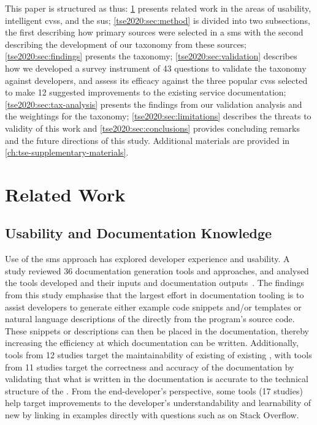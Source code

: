 This paper is structured as thus: \cref{tse2020:sec:related-work} presents related work in the areas of  usability, intelligent \glspl{cvs}, and the \gls{sus}; \cref{tse2020:sec:method} is divided into two subsections, the first describing how primary sources were selected in a \gls{sms} with the second describing the development of our taxonomy from these sources; \cref{tse2020:sec:findings} presents the taxonomy; \cref{tse2020:sec:validation} describes how we developed a survey instrument of 43 questions to validate the taxonomy against developers, and assess its efficacy against the three popular \glspl{cvs} selected to make 12 suggested improvements to the existing service  documentation; \cref{tse2020:sec:tax-analysis} presents the findings from our validation analysis and the weightings for the taxonomy; \cref{tse2020:sec:limitations} describes the threats to validity of this work and \cref{tse2020:sec:conclusions} provides concluding remarks and the future directions of this study. Additional materials are provided in \cref{ch:tse-supplementary-materials}.

\section{Related Work}
\label{tse2020:sec:related-work}



\subsection{ Usability and Documentation Knowledge}

Use of the \gls{sms} approach has explored developer experience and  usability. A~\citeyear{Nybom:2018ef} study reviewed 36  documentation generation tools and approaches, and analysed the tools developed and their inputs and documentation outputs~\citep{Nybom:2018ef}. The findings from this study emphasise that the largest effort in  documentation tooling is to assist developers to generate either example code snippets and/or templates or natural language descriptions of the  directly from the program's source code. These snippets or descriptions can then be placed in the  documentation, thereby increasing the efficiency at which  documentation can be written. Additionally, tools from 12 studies target the maintainability of existing  of existing , with tools from 11 studies target the correctness and accuracy of the documentation by validating that what is written in the documentation is accurate to the technical structure of the . From the end-developer's perspective, some tools (17 studies) help target improvements to the developer's understandability and learnability of new  by linking in examples directly with questions such as on Stack Overflow.

